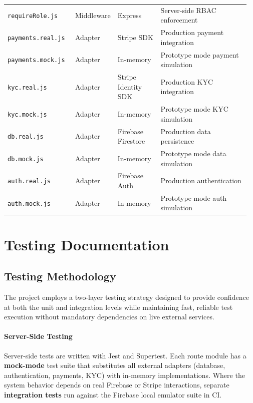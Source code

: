 \documentclass[11pt]{article}
\begin{document}
\begin{longtable}{@{}p{0.28\linewidth} p{0.12\linewidth} p{0.18\linewidth} p{0.38\linewidth}@{}}
\texttt{requireRole.js} & Middleware & Express & Server-side RBAC enforcement \\
\texttt{payments.real.js} & Adapter & Stripe SDK & Production payment integration \\
\texttt{payments.mock.js} & Adapter & In-memory & Prototype mode payment simulation \\
\texttt{kyc.real.js} & Adapter & Stripe Identity SDK & Production KYC integration \\
\texttt{kyc.mock.js} & Adapter & In-memory & Prototype mode KYC simulation \\
\texttt{db.real.js} & Adapter & Firebase Firestore & Production data persistence \\
\texttt{db.mock.js} & Adapter & In-memory & Prototype mode data simulation \\
\texttt{auth.real.js} & Adapter & Firebase Auth & Production authentication \\
\texttt{auth.mock.js} & Adapter & In-memory & Prototype mode auth simulation \\
\bottomrule
\end{longtable}

\newpage

\section{Testing Documentation}

\subsection{Testing Methodology}

The project employs a two-layer testing strategy designed to provide confidence at
both the unit and integration levels while maintaining fast, reliable test execution
without mandatory dependencies on live external services.

\paragraph{Server-Side Testing}
Server-side tests are written with Jest and Supertest. Each route module has a
\textbf{mock-mode} test suite that substitutes all external adapters (database,
authentication, payments, KYC) with in-memory implementations. Where the system
behavior depends on real Firebase or Stripe interactions, separate
\textbf{integration tests} run against the Firebase local emulator suite in CI.
\end{document}
